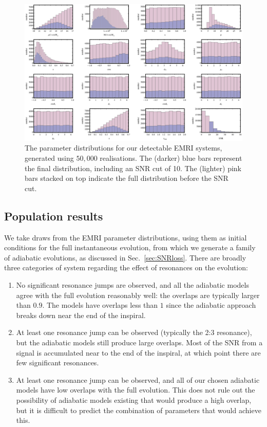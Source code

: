 \documentclass[aps,prd,amsfonts,amssymb,amsmath,nofootinbib,reprint,showpacs,superscriptaddress,twocolumn]{revtex4}
\newcommand{\secref}[1]{Sec.\ \ref{sec:#1}}
\begin{document}
\begin{figure}[htbp]
\centering
\includegraphics[width=\textwidth]{Fig_EMRIpar_dists}
\caption{\label{fig:EMRIpar-dists}The parameter distributions for our detectable EMRI systems, generated using $50,000$ realisations. The (darker) blue bars represent the final distribution, including an SNR cut of 10. The (lighter) pink bars stacked on top indicate the full distribution before the SNR cut.}
\end{figure}

\subsection{Population results}
\label{sec:population}

We take draws from the EMRI parameter distributions, using them as initial conditions for the full instantaneous evolution, from which we generate a family of adiabatic evolutions, as discussed in \secref{SNRloss}. There are broadly three categories of system regarding the effect of resonances on the evolution:

\begin{enumerate}
\item No significant resonance jumps are observed, and all the adiabatic models agree with the full evolution reasonably well: the overlaps are typically larger than $0.9$. The models have overlaps less than $1$ since the adiabatic approach breaks down near the end of the inspiral.

\item At least one resonance jump can be observed (typically the 2:3 resonance), but the adiabatic models still produce large overlaps. Most of the SNR from a signal is accumulated near to the end of the inspiral, at which point there are few significant resonances.

\item At least one resonance jump can be observed, and all of our chosen adiabatic models have low overlaps with the full evolution. This does not rule out the possibility of adiabatic models existing that would produce a high overlap, but it is difficult to predict the combination of parameters that would achieve this.
\end{enumerate}
\end{document}
